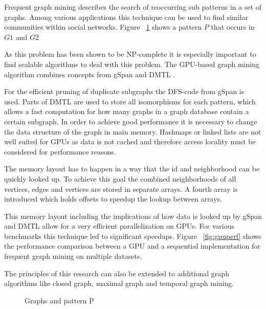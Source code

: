 \documentclass{sig-alternate}
\begin{document}
Frequent graph mining describes the search of reoccurring sub patterns 
in a set of graphs. Among various applications this technique can be used to
find similar communities within social networks.
Figure ~\ref{fig:subgraphs} shows a pattern $P$ that occurs in $G1$ and $G2$

As this problem has been shown to be NP-complete \cite{ullmann1976algorithm} it is especially important to
find scalable algorithms to deal with this problem.
The GPU-based graph mining algorithm combines concepts from gSpan \cite{yan2002gspan}
and DMTL \cite{chaoji2008integrated}.

For the efficient pruning of duplicate subgraphs the DFS-code from gSpan is used.
Parts of DMTL are used to store all isomorphisms for each pattern, which allows 
a fast computation for how many graphs in a graph database contain a certain subgraph.
In order to achieve good performance it is necessary 
to change the data structure of the graph in main memory. Hashmaps or linked lists
are not well suited for GPUs as data is not cached and therefore access locality 
must be considered for performance reasons. 

The memory layout has to happen in a way that the id and neighborhood can be quickly looked up.
To achieve this goal the combined neighborhoods of all vertices, edges and vertices are stored 
in separate arrays. A fourth array is introduced which holds offsets to speedup the lookup between arrays.

This memory layout including the implications of how data is looked up by gSpan and DMTL allow
for a very efficient parallelization on GPUs.
For various benchmarks this technique led to significant speedups. Figure ~\ref{fig:gpuperf}
shows the performance comparison between a GPU and a sequential implementation 
for frequent graph mining on multiple datasets.

The principles of this research can also be extended to additional graph algorithms like closed graph,
maximal graph and temporal graph mining.

\begin{figure}
\centering
{}
\caption{Graphs and pattern P}
\label{fig:subgraphs}
\end{figure}

\begin{figure*}
\centering
{}
\caption{GPU Benchmarks}
\label{fig:gpuperf}
\end{figure*}
\end{document}
